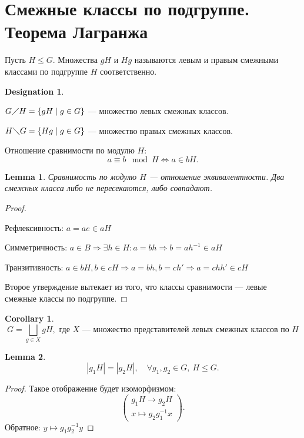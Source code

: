 \documentclass[11pt]{book}
\renewcommand{\le}{\leqslant}
\theoremstyle{definition}
\theoremstyle{plain}
\theoremstyle{plain}
\newtheorem{lm}{Lemma}
\newtheorem{cor}{Corollary}
\theoremstyle{definition}
\newtheorem*{name}{Designation}
\theoremstyle{remark}
\begin{document}
\section{Смежные классы по подгруппе. Теорема Лагранжа}
\begin{defn}
    Пусть $ H \le G$. Множества $ gH$ и  $ Hg$ называются {\sf левым и правым смежными классами по подгруппе} $ H$ соответственно.
    \begin{name}$ $
	\begin{description}[noitemsep]
	    \item
		$G \diagup H = \{gH \mid g \in G\} $ --- множество левых смежных классов.
	    \item
		$H \diagdown G = \{Hg \mid g \in G\} $ --- множество правых смежных классов.
	\end{description}
    \end{name}
\end{defn}
\begin{defn}
    Отношение сравнимости по модулю $ H$:
    \[
	a \equiv b \mod H  \Longleftrightarrow a \in bH
    .\]
\end{defn}
\begin{lm}
    Сравнимость по модулю $ H$ --- отношение эквивалентности. Два смежных класса либо не пересекаются, либо совпадают.
\end{lm}
\begin{proof}
    $ $
    \begin{description}[noitemsep]
	\item Рефлексивность: $ a = ae \in a H$
	\item Симметричность: $ a \in B \Longrightarrow \exists h \in H: a= bh \Longrightarrow  b=a h^{-1} \in  aH$
	\item Транзитивность: $ a \in bH, b \in cH \Longrightarrow a = bh, b = ch' \Longrightarrow a = chh' \in c H$
    \end{description}
    Второе утверждение вытекает из того, что классы сравнимости --- левые смежные классы по подгруппе.
\end{proof}
\begin{cor}
    $$G =\bigsqcup\limits_{g \in X} g H, \text{ где } X \text{ --- множество представителей левых смежных классов по $H$}$$
\end{cor}
\begin{lm}
    \[
	|g_1H| = |g_2H|, \quad \forall g_1, g_2 \in  G,~ H \le G
    .\]
\end{lm}
\begin{proof}
    Такое отображение будет изоморфизмом:
    \[
	\left (
	    \begin{array}{c}
		g_1H \to g_2H \\
		x \mapsto g_2 g_1^{-1} x
	    \end{array}
	\right )
    .\]
    Обратное: $y \mapsto g_1 g_2^{-1} y$
\end{proof}
\end{document}

